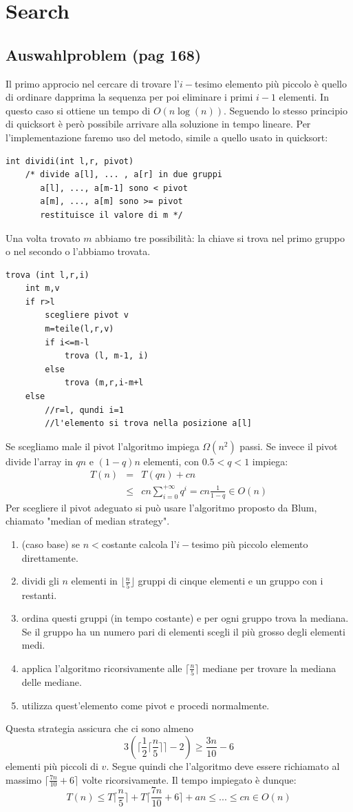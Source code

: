 \documentclass[a4paper]{book}
\begin{document}
\chapter{Search}
\section{Auswahlproblem (pag 168)}
Il primo approcio nel cercare di trovare l'$i-$tesimo elemento più piccolo è quello di ordinare dapprima la sequenza per poi eliminare i primi $i-1$ elementi. In questo caso si ottiene un tempo di $O(n \log (n))$. Seguendo lo stesso principio di quicksort è però possibile arrivare alla soluzione in tempo lineare. Per l'implementazione faremo uso del metodo, simile a quello usato in quicksort:
\begin{lstlisting}
int dividi(int l,r, pivot)
	/* divide a[l], ... , a[r] in due gruppi
	   a[l], ..., a[m-1] sono < pivot
	   a[m], ..., a[m] sono >= pivot
	   restituisce il valore di m */
\end{lstlisting}
Una volta trovato $m$ abbiamo tre possibilità: la chiave si trova nel primo gruppo o nel secondo o l'abbiamo trovata.
\begin{lstlisting}
trova (int l,r,i)
	int m,v
	if r>l
		scegliere pivot v
		m=teile(l,r,v)
		if i<=m-l
			trova (l, m-1, i)
		else
			trova (m,r,i-m+l
	else
		//r=l, qundi i=1
		//l'elemento si trova nella posizione a[l]	 			
\end{lstlisting}
Se scegliamo male il pivot l'algoritmo impiega $\Omega (n^2)$ passi. Se invece il pivot divide l'array in $qn$ e $(1-q)n$ elementi, con $0.5<q<1$ impiega:
\begin{eqnarray}
T(n) &=& T(qn)+cn \nonumber \\
& \leq & cn \sum_{i=0}^{+\infty} q^i = cn \frac{1}{1-q} \in O(n)
\end{eqnarray}
Per scegliere il pivot adeguato si può usare l'algoritmo proposto da Blum, chiamato "median of median strategy".
\begin{enumerate}
\item (caso base) se $n<$costante calcola l'$i-$tesimo più piccolo elemento direttamente.
\item dividi gli $n$ elementi in $\lfloor \frac{n}{5} \rfloor$ gruppi di cinque elementi e un gruppo con i restanti. 
\item ordina questi gruppi (in tempo costante) e per ogni gruppo trova la mediana. Se il gruppo ha un numero pari di elementi scegli il più grosso degli elementi medi. 
\item applica l'algoritmo ricorsivamente alle $\lceil \frac{n}{5} \rceil$ mediane per trovare la mediana delle mediane.
\item utilizza quest'elemento come pivot e procedi normalmente.
\end{enumerate}
Questa strategia assicura che ci sono almeno 
$$ 3(\lceil \frac{1}{2} \lceil \frac{n}{5} \rceil \rceil -2) \geq \frac{3n}{10} -6$$
elementi più piccoli di $v$. Segue quindi che l'algoritmo deve essere richiamato al massimo $ \lceil \frac{7n}{10} + 6 \rceil$ volte ricorsivamente. Il tempo impiegato è dunque:
$$ T(n) \leq T\lceil \frac{n}{5} \rceil +T \lceil \frac{7n}{10} +6 \rceil + an \leq ... \leq cn \in O(n) $$
\end{document}
